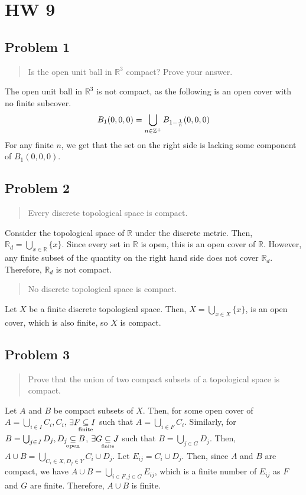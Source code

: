 \documentclass[8pt]{extarticle}
\title{}
\author{Avinash Iyer}
\date{}
\newcommand{\finite}{\underset{\clap{\tiny finite}}{\subseteq}}
\begin{document}
{
\section*{HW 9}
\subsection*{Problem 1}
\begin{quote}
	Is the open unit ball in $\mathbb{R}^3$ compact? Prove your answer.
\end{quote}
The open unit ball in $\mathbb R^3$ is not compact, as the following is an open cover with no finite subcover.
\[
	B_{1}(0,0,0) = \bigcup_{n\in\mathbb{Z}^{+}} B_{\tiny 1-\frac{1}{n}}(0,0,0)
\]
For any finite $n$, we get that the set on the right side is lacking some component of $B_{1}(0,0,0)$.
\subsection*{Problem 2}
\begin{quote}
	Every discrete topological space is compact.
\end{quote}
Consider the topological space of $\mathbb R$ under the discrete metric. Then, $\mathbb{R}_d= \bigcup_{x\in\mathbb{R}} \{x\}$. Since every set in $\mathbb{R}$ is open, this is an open cover of $\mathbb R$. However, any finite subset of the quantity on the right hand side does not cover $\mathbb{R}_d$. Therefore, $\mathbb{R}_d$ is not compact.
\begin{quote}
	No discrete topological space is compact.
\end{quote}
Let $X$ be a finite discrete topological space. Then, $X = \bigcup_{x\in X} \{x\}$, is an open cover, which is also finite, so $X$ is compact.
\subsection*{Problem 3}
\begin{quote}
	Prove that the union of two compact subsets of a topological space is compact.
\end{quote}
Let $A$ and $B$ be compact subsets of $X$. Then, for some open cover of $A = \bigcup_{i\in I} C_{i}, C_{i}$, $\exists F\underset{\clap{\scriptsize finite}}{\subseteq} I$ such that $A = \bigcup_{i\in F} C_i$. Similarly, for $B = \bigcup_{j\in J}D_j, D_{j}\underset{\clap{\scriptsize open}}{\subseteq} B$, $\exists G\finite J$ such that $B = \bigcup_{j\in G} D_{j}$. Then, $A\cup B = \bigcup_{C_{i}\in X,D_{j}\in Y} C_{i}\cup D_{j}$. Let $E_{ij} = C_{i}\cup D_{j}$. Then, since $A$ and $B$ are compact, we have $A\cup B = \bigcup_{i\in F, j\in G}E_{ij}$, which is a finite number of $E_{ij}$ as $F$ and $G$ are finite. Therefore, $A\cup B$ is finite.
}
\end{document}
